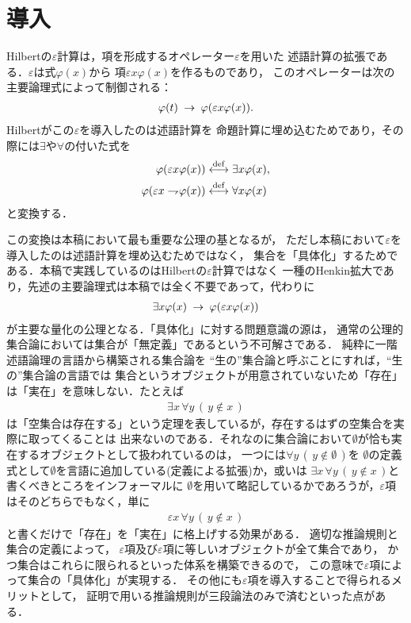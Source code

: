 \section{導入}
	Hilbertの$\varepsilon$計算は，項を形成するオペレーター$\varepsilon$を用いた
	述語計算の拡張である．$\varepsilon$は式$\varphi(x)$から
	項$\varepsilon x \varphi(x)$を作るものであり，
	このオペレーターは次の主要論理式によって制御される：
	\begin{align}
		\varphi(t) \hspace{0.25em}\rightarrow\hspace{0.25em} \varphi(\varepsilon x \varphi(x)).
	\end{align}
	Hilbertがこの$\varepsilon$を導入したのは述語計算を
	命題計算に埋め込むためであり，その際には$\exists$や$\forall$の付いた式を
	\begin{align}
		\varphi(\varepsilon x \varphi(x)) &\overset{\mathrm{def}}{\longleftrightarrow} \exists x \varphi(x), \\
		\varphi(\varepsilon x \rightharpoondown\hspace{-0.25em} \varphi(x)) &\overset{\mathrm{def}}{\longleftrightarrow} \forall x \varphi(x)
	\end{align}
	と変換する．
	
	この変換は本稿において最も重要な公理の基となるが，
	ただし本稿において$\varepsilon$を導入したのは述語計算を埋め込むためではなく，
	集合を「具体化」するためである．本稿で実践しているのはHilbertの$\varepsilon$計算ではなく
	一種のHenkin拡大であり，先述の主要論理式は本稿では全く不要であって，代わりに
	\begin{align}
		\exists x \varphi(x) \hspace{0.25em}\rightarrow\hspace{0.25em} \varphi(\varepsilon x \varphi(x))
	\end{align}
	が主要な量化の公理となる．「具体化」に対する問題意識の源は，
	通常の公理的集合論においては集合が「無定義」であるという不可解さである．
	純粋に一階述語論理の言語から構築される集合論を
	``生の''集合論と呼ぶことにすれば，``生の''集合論の言語では
	集合というオブジェクトが用意されていないため「存在」は「実在」を意味しない．たとえば
	\begin{align}
		\exists x\, \forall y\, (\, y \notin x\, )
	\end{align}
	は「空集合は存在する」という定理を表しているが，存在するはずの空集合を実際に取ってくることは
	出来ないのである．それなのに集合論において$\emptyset$が恰も実在するオブジェクトとして扱われているのは，
	一つには$\forall y\, (\, y \notin \emptyset\, )$を
	$\emptyset$の定義式として$\emptyset$を言語に追加している(定義による拡張)か，或いは
	$\exists x\, \forall y\, (\, y \notin x\, )$と書くべきところをインフォーマルに
	$\emptyset$を用いて略記しているかであろうが，$\varepsilon$項はそのどちらでもなく，単に
	\begin{align}
		\varepsilon x\, \forall y\, (\, y \notin x\, )
	\end{align}
	と書くだけで「存在」を「実在」に格上げする効果がある．
	適切な推論規則と集合の定義によって，
	$\varepsilon$項及び$\varepsilon$項に等しいオブジェクトが全て集合であり，
	かつ集合はこれらに限られるといった体系を構築できるので，
	この意味で$\varepsilon$項によって集合の「具体化」が実現する．
	その他にも$\varepsilon$項を導入することで得られるメリットとして，
	証明で用いる推論規則が三段論法のみで済むといった点がある．
	
